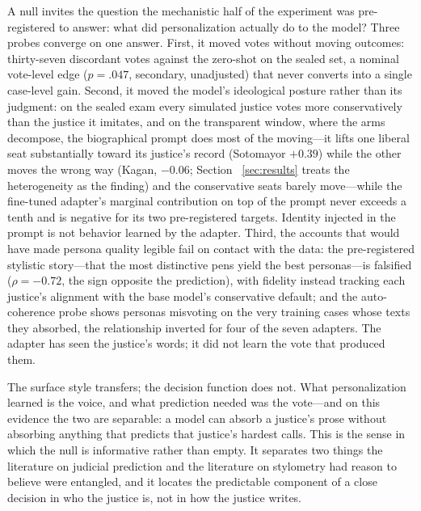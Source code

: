 A null invites the question the mechanistic half of the experiment
was pre-registered to answer: what did personalization actually do
to the model? Three probes converge on one answer. First, it moved
votes without moving outcomes: thirty-seven discordant votes
against the zero-shot on the sealed set, a nominal vote-level edge
($p=.047$, secondary, unadjusted) that never converts into a single
case-level gain. Second, it moved the model's ideological posture
rather than its judgment: on the sealed exam every simulated
justice votes more conservatively than the justice it imitates, and
on the transparent window, where the arms decompose, the
biographical prompt does most of the moving---it lifts one liberal
seat substantially toward its justice's record (Sotomayor $+0.39$)
while the other moves the wrong way (Kagan, $-0.06$; Section~
\ref{sec:results} treats the heterogeneity as the finding) and the
conservative seats barely move---while the fine-tuned adapter's marginal contribution on top
of the prompt never exceeds a tenth and is negative for its two
pre-registered targets. Identity injected in the prompt is not
behavior learned by the adapter. Third, the accounts that would
have made persona quality legible fail on contact with the data:
the pre-registered stylistic story---that the most distinctive pens
yield the best personas---is falsified ($\rho=-0.72$, the sign
opposite the prediction), with fidelity instead tracking each
justice's alignment with the base model's conservative default; and
the auto-coherence probe shows personas misvoting on the very
training cases whose texts they absorbed, the relationship inverted
for four of the seven adapters. The adapter has seen the justice's
words; it did not learn the vote that produced them.

The surface style transfers; the decision function does not. What
personalization learned is the voice, and what prediction needed
was the vote---and on this evidence the two are separable: a model
can absorb a justice's prose without absorbing anything that
predicts that justice's hardest calls. This is the sense in which
the null is informative rather than empty. It separates two things
the literature on judicial prediction and the literature on
stylometry had reason to believe were entangled, and it locates the
predictable component of a close decision in who the justice is,
not in how the justice writes.
